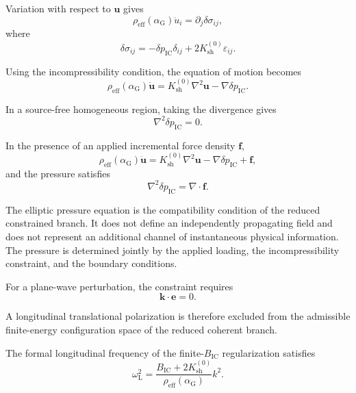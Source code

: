 Variation with respect to $\mathbf{u}$ gives
\begin{equation}
    \rho_{\mathrm{eff}}(\alpha_{\mathrm{G}})\ddot{u}_{i} = \partial_{j}\delta\sigma_{ij},
\end{equation}
where
\begin{equation}
    \delta\sigma_{ij} = -\delta p_{\mathrm{IC}}\delta_{ij} + 2K_{\mathrm{sh}}^{(0)}\varepsilon_{ij}.
\end{equation}

Using the incompressibility condition, the equation of motion becomes
\begin{equation}
    \rho_{\mathrm{eff}}(\alpha_{\mathrm{G}})\ddot{\mathbf{u}} = K_{\mathrm{sh}}^{(0)}\nabla^2\mathbf{u} - \nabla\delta p_{\mathrm{IC}}.
\end{equation}

In a source-free homogeneous region, taking the divergence gives
\begin{equation}
    \nabla^2\delta p_{\mathrm{IC}} = 0.
\end{equation}

In the presence of an applied incremental force density $\mathbf{f}$,
\begin{equation}
    \rho_{\mathrm{eff}}(\alpha_{\mathrm{G}})\ddot{\mathbf{u}} = K_{\mathrm{sh}}^{(0)}\nabla^2\mathbf{u} - \nabla\delta p_{\mathrm{IC}} + \mathbf{f},
\end{equation}
and the pressure satisfies
\begin{equation}
    \nabla^2\delta p_{\mathrm{IC}} = \nabla\cdot\mathbf{f}.
\end{equation}

The elliptic pressure equation is the compatibility condition of the reduced constrained branch. It does not define an independently propagating field and does not represent an additional channel of instantaneous physical information. The pressure is determined jointly by the applied loading, the incompressibility constraint, and the boundary conditions.

For a plane-wave perturbation, the constraint requires
\begin{equation}
    \mathbf{k}\cdot\mathbf{e} = 0.
\end{equation}

A longitudinal translational polarization is therefore excluded from the admissible finite-energy configuration space of the reduced coherent branch.

The formal longitudinal frequency of the finite-$B_{\mathrm{IC}}$ regularization satisfies
\begin{equation}
    \omega_{\mathrm{L}}^2 = \frac{B_{\mathrm{IC}}+2K_{\mathrm{sh}}^{(0)}}{\rho_{\mathrm{eff}}(\alpha_{\mathrm{G}})}k^2.
\end{equation}

